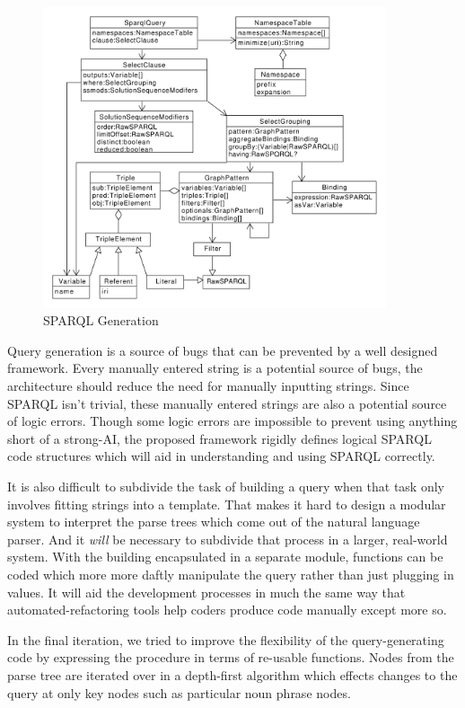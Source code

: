 \documentclass[11pt]{article}
\begin{document}
\begin{figure}[h!]
    \centering
    \includegraphics[width=0.9\textwidth,natwidth=1,natheight=1]{umlet/sparql.pdf}
    \caption{SPARQL Generation \cite{sparql, sparql11}}
    \label{fig:sparql_gen}
\end{figure}

Query generation is a source of bugs that can be prevented by a well
designed framework. Every manually entered string is a potential source of bugs, the
architecture should reduce the need for manually inputting strings. Since SPARQL isn't
trivial, these manually entered strings are also a potential source
of logic errors. Though some logic errors are impossible to prevent using anything short of
a strong-AI, the proposed framework rigidly defines logical SPARQL code structures which
will aid in understanding and using SPARQL correctly. 

It is also difficult to subdivide the task of building a query when that task only
involves fitting strings into a template. That makes it hard to design a modular system to
interpret the parse trees which come out of the natural language parser. And it {\em will}
be necessary to subdivide that process in a larger, real-world system. With the building
encapsulated in a separate module, functions can be coded which more more daftly manipulate
the query rather than just plugging in values. It will aid the development processes in
much the same way that automated-refactoring tools help coders produce code manually except
more so.

In the final iteration, we tried to improve the flexibility of the 
query-generating code by expressing the procedure in terms of re-usable
functions. Nodes from the parse tree are iterated over in a depth-first
algorithm which effects changes to the query at only key nodes such
as particular noun phrase nodes.
\end{document}
